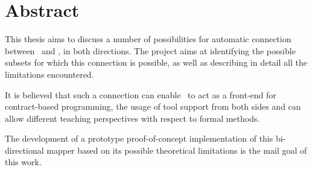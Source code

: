 \chapter*{Abstract}

This thesis aims to discuss a number of possibilities for automatic connection between \vpp\ and \jml, in both directions. The project aims at identifying  the possible subsets for which this connection is possible, as well as describing in detail all the limitations encountered. 

It is believed that such a connection can enable \vpp\ to act as a front-end for contract-based programming, the usage of tool support from both sides and can allow different teaching perspectives with respect to formal methods. 

The development of a prototype proof-of-concept implementation of this bi-directional mapper based on its possible theoretical limitations is the mail goal of this work.

